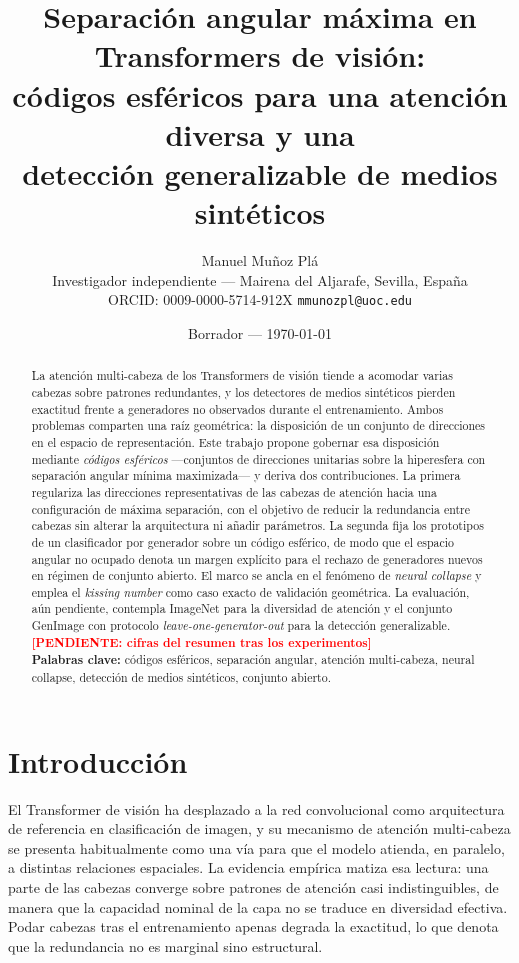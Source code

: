 \documentclass[11pt,a4paper]{article}
\title{\textbf{Separación angular máxima en Transformers de visión:\\
códigos esféricos para una atención diversa y una\\
detección generalizable de medios sintéticos}}
\author{Manuel Muñoz Plá\\
  \small Investigador independiente --- Mairena del Aljarafe, Sevilla, España\\
  \small ORCID: 0009-0000-5714-912X \quad\textbar\quad
  \texttt{mmunozpl@uoc.edu}}
\date{Borrador --- \today}
\theoremstyle{plain}
\newcommand{\todo}[1]{\textcolor{red}{\textbf{[PENDIENTE: #1]}}}
\begin{document}
\maketitle

\begin{abstract}
\noindent
La atención multi-cabeza de los Transformers de visión tiende a
acomodar varias cabezas sobre patrones redundantes, y los detectores de
medios sintéticos pierden exactitud frente a generadores no observados
durante el entrenamiento. Ambos problemas comparten una raíz geométrica:
la disposición de un conjunto de direcciones en el espacio de
representación. Este trabajo propone gobernar esa disposición mediante
\emph{códigos esféricos} ---conjuntos de direcciones unitarias sobre la
hiperesfera con separación angular mínima maximizada--- y deriva dos
contribuciones. La primera regulariza las direcciones representativas de
las cabezas de atención hacia una configuración de máxima separación,
con el objetivo de reducir la redundancia entre cabezas sin alterar la
arquitectura ni añadir parámetros. La segunda fija los prototipos de un
clasificador por generador sobre un código esférico, de modo que el
espacio angular no ocupado denota un margen explícito para el rechazo de
generadores nuevos en régimen de conjunto abierto. El marco se ancla en
el fenómeno de \emph{neural collapse} y emplea el \emph{kissing number}
como caso exacto de validación geométrica. La evaluación, aún
pendiente, contempla ImageNet para la diversidad de atención y el
conjunto GenImage con protocolo \emph{leave-one-generator-out} para la
detección generalizable. \todo{cifras del resumen tras los
experimentos}
\\[4pt]
\noindent\textbf{Palabras clave:} códigos esféricos, separación angular,
atención multi-cabeza, neural collapse, detección de medios sintéticos,
conjunto abierto.
\end{abstract}

\section{Introducción}
\label{sec:intro}

El Transformer de visión ha desplazado a la red convolucional como
arquitectura de referencia en clasificación de imagen, y su mecanismo de
atención multi-cabeza se presenta habitualmente como una vía para que el
modelo atienda, en paralelo, a distintas relaciones espaciales. La
evidencia empírica matiza esa lectura: una parte de las cabezas
converge sobre patrones de atención casi indistinguibles, de manera que
la capacidad nominal de la capa no se traduce en diversidad efectiva.
Podar cabezas tras el entrenamiento apenas degrada la exactitud, lo que
denota que la redundancia no es marginal sino estructural.
\end{document}
